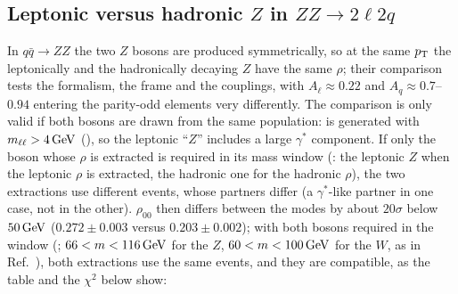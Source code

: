 \subsection{Leptonic versus hadronic $Z$ in $ZZ\to2\ell2q$}
\label{app:truth:lephad}
In $q\bar q \to ZZ$ the two $Z$ bosons are produced symmetrically, so at the same $p_{\mathrm{T}}$ the leptonically and the
hadronically decaying $Z$ have the same $\rho$; their comparison tests the formalism, the frame and the couplings, with
$A_\ell \approx 0.22$ and $A_q \approx 0.7$--$0.94$ entering the parity-odd elements very differently. The comparison
is only valid if both bosons are drawn from the same population:  is generated with
$m_{\ell\ell} > 4\,\mathrm{GeV}$ (), so the leptonic ``$Z$'' includes a large $\gamma^*$ component. If only
the boson whose $\rho$ is extracted is required in its mass window (: the leptonic $Z$ when the
leptonic $\rho$ is extracted, the hadronic one for the hadronic $\rho$), the two extractions use different events, whose
partners differ (a $\gamma^*$-like partner in one case, not in the other). $\rho_{00}$ then differs between the modes
by about $20\sigma$ below $50\,\mathrm{GeV}$ ($0.272 \pm 0.003$ versus $0.203 \pm 0.002$); with both bosons required in the
window (; $66 < m < 116\,\mathrm{GeV}$ for the $Z$, $60 < m < 100\,\mathrm{GeV}$ for the $W$, as in
Ref.~\cite{Gao:2026bvp}), both extractions use the same events, and they are compatible, as the table and the $\chi^2$ below show:

